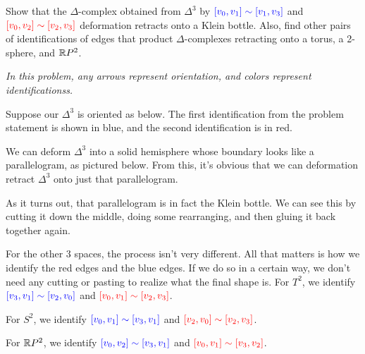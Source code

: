 \documentclass[twoside,10pt]{article}
\begin{document}

\begin{exer}[1.2: 2]
	Show that the $\Delta$-complex obtained from $\Delta^{3}$ by ${\color{blue}[v_0,v_1]\sim [v_1,v_3]}$ and ${\color{red}[v_0,v_2]\sim [v_2,v_3]}$ deformation retracts onto a Klein bottle. Also, find other pairs of identifications of edges that product $\Delta$-complexes retracting onto a torus, a 2-sphere, and $\mathbb{R} P^2$.
\end{exer}

\begin{center}
	\textit{In this problem, any arrows represent orientation, and colors represent identificationss.}
\end{center}

Suppose our $\Delta^{3}$ is oriented as below. The first identification from the problem statement is shown in blue, and the second identification is in red.

\vspace{2in}

We can deform $\Delta^{3}$ into a solid hemisphere whose boundary looks like a parallelogram, as pictured below. From this, it's obvious that we can deformation retract $\Delta^{3}$ onto just that parallelogram.

\vspace{2in}

As it turns out, that parallelogram is in fact the Klein bottle. We can see this by cutting it down the middle, doing some rearranging, and then gluing it back together again.

\newpage

For the other 3 spaces, the process isn't very different. All that matters is how we identify the red edges and the blue edges. If we do so in a certain way, we don't need any cutting or pasting to realize what the final shape is. For $T^2$, we identify ${\color{blue}[v_3,v_1] \sim [v_2,v_0]}$ and ${\color{red}[v_0,v_1] \sim [v_2,v_3]}$.

\vspace{2in}

For $S^2$, we identify ${\color{blue}[v_0,v_1] \sim [v_3,v_1]}$ and ${\color{red}[v_2,v_0] \sim [v_2,v_3]}$.

\vspace{2in}

For $\mathbb{R} P^2$, we identify ${\color{blue}[v_0,v_2]\sim[v_3,v_1]}$ and ${\color{red}[v_0,v_1]\sim[v_3,v_2]}$.
\end{document}

